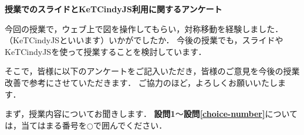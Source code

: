 \documentclass[a4paper]{jarticle}
\begin{document}
\noindent

\begin{center}
{\bf\Large 授業でのスライドと{\sf KeTCindyJS}利用に関するアンケート}
\end{center}

今回の授業で，ウェブ上で図を操作してもらい，対称移動を経験しました．（KeTCindyJSといいます）いかがでしたか．
今後の授業でも，スライドやKeTCindyJSを使って授業することを検討しています．

そこで，皆様に以下のアンケートをご記入いただき，皆様のご意見を今後の授業改善で参考にさせていただきます．
ご協力のほど，よろしくお願いいたします．

\vspace{3mm}
まず，授業内容についてお聞きします．
{\bf 設問1}〜{\bf 設問\ref{choice-number}}については，当てはまる番号を$\bigcirc$で囲んでください．
\end{document}
